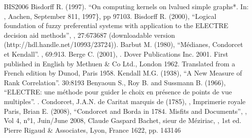 \documentclass[a4paper,12pt,english]{sphinxhowto}
\begin{document}
\begin{sphinxthebibliography}{BIS\sphinxhyphen{}2006}
\sphinxAtStartPar
Bisdorff R. (1997). “On computing kernels on l\sphinxhyphen{}valued simple graphs*. In:
, Aachen, September 8\sphinxhyphen{}11, 1997\}, pp 97\textendash{}103.
\sphinxAtStartPar
Bisdorff R. (2000), “Logical foundation of fuzzy preferential systems with application to the ELECTRE decision aid methods”, , 27:673\sphinxhyphen{}687 (downloadable version  (http://hdl.handle.net/10993/23724)).
\sphinxAtStartPar
Barbut M. (1980), “Médianes, Condorcet et Kendall”. , 69:9\textendash{}13.
\sphinxAtStartPar
Berge C. (2001), . Dover Publications Inc. 2001. First published in English by Methuen \& Co Ltd., London 1962. Translated from a French edition by Dunod, Paris 1958.
\sphinxAtStartPar
Kendall M.G. (1938), “A New Measure of Rank Correlation”.  30:81\textendash{}93
\sphinxAtStartPar
Benyaoun S., Roy B. and Sussmann B. (1966), “ELECTRE: une méthode pour guider le choix en présence de points de vue multiples”. .
\sphinxAtStartPar
Condorcet, J.A.N. de Caritat marquis de (1785), , Imprimerie royale Paris, 
\sphinxAtStartPar
Brian E. (2008), “Condorcet and Borda in 1784. Misfits and Documents”, , Vol 4, n°1, Juin/June 2008, 
\sphinxAtStartPar
Claude Gaspard Bachet, sieur de Méziriac,  , 1st ed. Pierre Rigaud \& Associates, Lyon, France 1622, pp. 143\sphinxhyphen{}146

\end{sphinxthebibliography}
\end{document}
